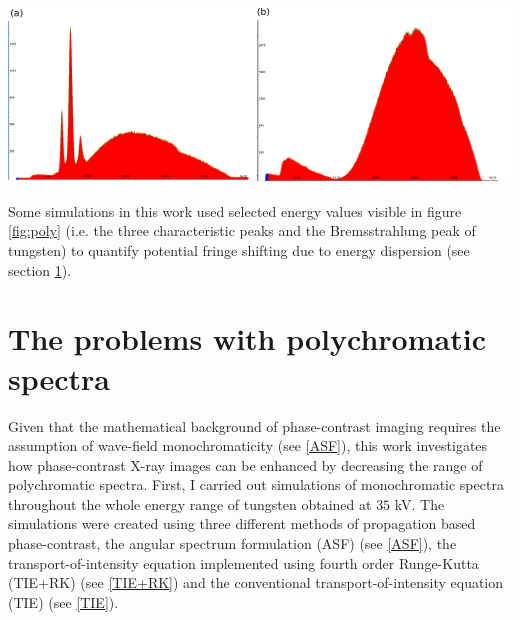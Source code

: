 \documentclass[10pt, a4paper, singlespacing]{report}
\newenvironment{Figure}
    {\par\medskip\noindent\minipage{\linewidth}}
    {\endminipage\par\medskip}
\begin{document}
\begin{Figure}
\centering
\includegraphics[width=\linewidth]{W_poly_spectrum.pdf}
\label{fig:poly}
\end{Figure}

Some simulations in this work used selected energy values visible in figure \ref{fig:poly} (i.e. the three characteristic peaks and the Bremsstrahlung peak of tungsten) to quantify potential fringe shifting due to energy dispersion (see section \ref{poly}).

\section{The problems with polychromatic spectra}\label{poly}
Given that the mathematical background of phase-contrast imaging requires the assumption of wave-field monochromaticity (see \ref{ASF}), this work investigates how phase-contrast X-ray images can be enhanced by decreasing the range of polychromatic spectra. 
First, I carried out simulations of monochromatic spectra throughout the whole energy range of tungsten obtained at $35$ kV. The simulations were created using three different methods of propagation based phase-contrast, the angular spectrum formulation (ASF) (see \ref{ASF}), the transport-of-intensity equation implemented using fourth order Runge-Kutta (TIE+RK) (see \ref{TIE+RK}) and the conventional transport-of-intensity equation (TIE) (see \ref{TIE}).
\end{document}
